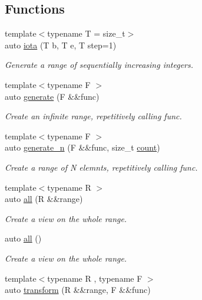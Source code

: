 \subsection*{Functions}
\begin{DoxyCompactItemize}
\item 
{\footnotesize template$<$typename T  = size\+\_\+t$>$ }\\auto \mbox{\hyperlink{namespacerah_1_1view_aa5f05009b0c914331b0e5dbe62656b5a}{iota}} (T b, T e, T step=1)
\begin{DoxyCompactList}\small\item\em Generate a range of sequentially increasing integers. \end{DoxyCompactList}\item 
{\footnotesize template$<$typename F $>$ }\\auto \mbox{\hyperlink{namespacerah_1_1view_a05a3de164c8d1fde6ca761119d90a789}{generate}} (F \&\&func)
\begin{DoxyCompactList}\small\item\em Create an infinite range, repetitively calling func. \end{DoxyCompactList}\item 
{\footnotesize template$<$typename F $>$ }\\auto \mbox{\hyperlink{namespacerah_1_1view_af179430e133efcf7d352b9446365e279}{generate\+\_\+n}} (F \&\&func, size\+\_\+t \mbox{\hyperlink{namespacerah_aa528865cc4a45d4eb276329554f16b4b}{count}})
\begin{DoxyCompactList}\small\item\em Create a range of N elemnts, repetitively calling func. \end{DoxyCompactList}\item 
{\footnotesize template$<$typename R $>$ }\\auto \mbox{\hyperlink{namespacerah_1_1view_a08f246d1e3e728738c48741274f5e9d7}{all}} (R \&\&range)
\begin{DoxyCompactList}\small\item\em Create a view on the whole range. \end{DoxyCompactList}\item 
auto \mbox{\hyperlink{namespacerah_1_1view_addec9cf697ca9378bb7b68ad732d9a0d}{all}} ()
\begin{DoxyCompactList}\small\item\em Create a view on the whole range. \end{DoxyCompactList}\item 
{\footnotesize template$<$typename R , typename F $>$ }\\auto \mbox{\hyperlink{namespacerah_1_1view_a73d98aff6def51242231b9ec440dd026}{transform}} (R \&\&range, F \&\&func)

\end{DoxyCompactItemize}
